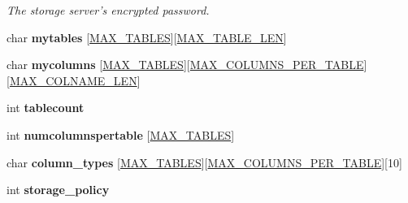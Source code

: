 \begin{DoxyCompactItemize}
\begin{DoxyCompactList}\small\item\em The storage server's encrypted password. \end{DoxyCompactList}\item 
\hypertarget{structconfig__params_aff2d2ab3475d10ff8f67c2d8cba5a6e3}{char {\bfseries mytables} \mbox{[}\hyperlink{storage_8h_a6f4cdd0162e9f2ab251fa5b23410c8da}{M\-A\-X\-\_\-\-T\-A\-B\-L\-E\-S}\mbox{]}\mbox{[}\hyperlink{storage_8h_ae7854bc280576d57ec5c80995d5ea94c}{M\-A\-X\-\_\-\-T\-A\-B\-L\-E\-\_\-\-L\-E\-N}\mbox{]}}\label{structconfig__params_aff2d2ab3475d10ff8f67c2d8cba5a6e3}

\item 
\hypertarget{structconfig__params_adf3f2d8983e5aa0bb69e9c1c7a84f5e9}{char {\bfseries mycolumns} \mbox{[}\hyperlink{storage_8h_a6f4cdd0162e9f2ab251fa5b23410c8da}{M\-A\-X\-\_\-\-T\-A\-B\-L\-E\-S}\mbox{]}\mbox{[}\hyperlink{storage_8h_a2c806bc7de304d1d07bb12c9d58dbdd1}{M\-A\-X\-\_\-\-C\-O\-L\-U\-M\-N\-S\-\_\-\-P\-E\-R\-\_\-\-T\-A\-B\-L\-E}\mbox{]}\mbox{[}\hyperlink{storage_8h_a5cced553ee7679aebe25952d79c7b86b}{M\-A\-X\-\_\-\-C\-O\-L\-N\-A\-M\-E\-\_\-\-L\-E\-N}\mbox{]}}\label{structconfig__params_adf3f2d8983e5aa0bb69e9c1c7a84f5e9}

\item 
\hypertarget{structconfig__params_aee0396277e5cb8b2456f39d4819cbdfb}{int {\bfseries tablecount}}\label{structconfig__params_aee0396277e5cb8b2456f39d4819cbdfb}

\item 
\hypertarget{structconfig__params_a2165cb323fd13024f71a7764f8c3f6cf}{int {\bfseries numcolumnspertable} \mbox{[}\hyperlink{storage_8h_a6f4cdd0162e9f2ab251fa5b23410c8da}{M\-A\-X\-\_\-\-T\-A\-B\-L\-E\-S}\mbox{]}}\label{structconfig__params_a2165cb323fd13024f71a7764f8c3f6cf}

\item 
\hypertarget{structconfig__params_a6db634a4f998dd30c5c292076c30bc25}{char {\bfseries column\-\_\-types} \mbox{[}\hyperlink{storage_8h_a6f4cdd0162e9f2ab251fa5b23410c8da}{M\-A\-X\-\_\-\-T\-A\-B\-L\-E\-S}\mbox{]}\mbox{[}\hyperlink{storage_8h_a2c806bc7de304d1d07bb12c9d58dbdd1}{M\-A\-X\-\_\-\-C\-O\-L\-U\-M\-N\-S\-\_\-\-P\-E\-R\-\_\-\-T\-A\-B\-L\-E}\mbox{]}\mbox{[}10\mbox{]}}\label{structconfig__params_a6db634a4f998dd30c5c292076c30bc25}

\item 
\hypertarget{structconfig__params_a6ee1091726a959383bb2b6d294842fce}{int {\bfseries storage\-\_\-policy}}\label{structconfig__params_a6ee1091726a959383bb2b6d294842fce}


\end{DoxyCompactItemize}
